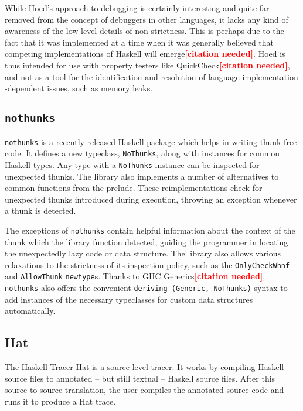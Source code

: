 \documentclass[thesis=B,english]{FITthesis}[2019/12/23]
\newcommand{\citationNeeded}{\textcolor{red}{\textbf{[citation needed]}}}
\newcommand{\hackage}[1]{\texttt{#1}}
\newcommand{\hsType}[1]{\texttt{#1}}
\newcommand{\hsTC}[1]{\texttt{#1}}
\newcommand{\hsCode}[1]{\texttt{#1}}
\begin{document}
While Hoed's approach to debugging is certainly interesting and quite far
removed from the concept of debuggers in other languages, it lacks any kind of
awareness of the low-level details of non-strictness. This is perhaps due to
the fact that it was implemented at a time when it was generally believed that
competing implementations of Haskell will emerge\citationNeeded.  Hoed is thus
intended for use with property testers like QuickCheck\citationNeeded, and not
as a tool for the identification and resolution of language implementation
-dependent issues, such as memory leaks.


\subsection*{\hackage{nothunks}} \label{sec:nothunks}
\hackage{nothunks} is a recently released Haskell package which helps in writing
thunk-free code. It defines a new typeclass, \hsTC{NoThunks}, along with
instances for common Haskell types. Any type with a \hsTC{NoThunks} instance
can be inspected for unexpected thunks. The library also implements a number of
alternatives to common functions from the prelude. These re\-implementations
check for unexpected thunks introduced during execution, throwing an exception
whenever a thunk is detected.

The exceptions of \hackage{nothunks} contain helpful information about the
context of the thunk which the library function detected, guiding the
programmer in locating the unexpectedly lazy code or data structure. The
library also allows various relaxations to the strictness of its inspection
policy, such as the \hsType{OnlyCheckWhnf} and \hsType{AllowThunk}
\hsCode{newtype}s. Thanks to GHC Generics\citationNeeded, \hackage{nothunks}
also offers the convenient \hsCode{deriving (Generic, NoThunks)} syntax to add
instances of the necessary typeclasses for custom data structures
automatically.


\subsection*{Hat} \label{sec:hat}
The Haskell Tracer Hat\cite{proj-hat} is a source-level tracer. It works by
compiling Haskell source files to annotated -- but still textual -- Haskell
source files. After this source-to-source translation, the user compiles the
annotated source code and runs it to produce a Hat trace.
\end{document}
